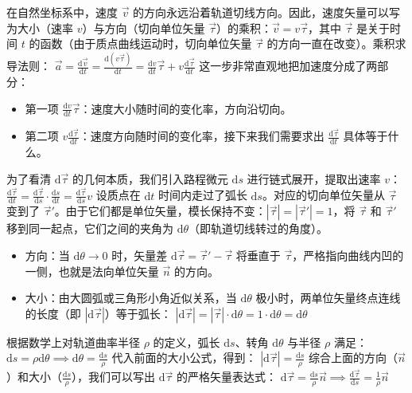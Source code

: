 \documentclass[lang=cn,11pt]{elegantbook}
\begin{document}
在自然坐标系中，速度 $\vec{v}$ 的方向永远沿着轨道切线方向。因此，速度矢量可以写为大小（速率 $v$）与方向（切向单位矢量 $\vec{\tau}$）的乘积：$\vec{v} = v\vec{\tau}$，其中 $\vec{\tau}$ 是关于时间 $t$ 的函数（由于质点曲线运动时，切向单位矢量 $\vec{\tau}$ 的方向一直在改变）。乘积求导法则： \(\vec{a} = \frac{\mathrm{d}\vec{v}}{\mathrm{d}t} = \frac{\mathrm{d}(v\vec{\tau})}{\mathrm{d}t} = \frac{\mathrm{d}v}{\mathrm{d}t}\vec{\tau} + v\frac{\mathrm{d}\vec{\tau}}{\mathrm{d}t}\) 
这一步非常直观地把加速度分成了两部分：
\begin{itemize}
\item 第一项 $\frac{\mathrm{d}v}{\mathrm{d}t}\vec{\tau}$：速度大小随时间的变化率，方向沿切向。
\item 第二项 $v\frac{\mathrm{d}\vec{\tau}}{\mathrm{d}t}$：速度方向随时间的变化率，接下来我们需要求出 $\frac{\mathrm{d}\vec{\tau}}{\mathrm{d}t}$ 具体等于什么。
\end{itemize}
为了看清 $\mathrm{d}\vec{\tau}$ 的几何本质，我们引入路程微元 $\mathrm{d}s$ 进行链式展开，提取出速率 $v$：
 \(\frac{\mathrm{d}\vec{\tau}}{\mathrm{d}t} = \frac{\mathrm{d}\vec{\tau}}{\mathrm{d}s} \cdot \frac{\mathrm{d}s}{\mathrm{d}t} = \frac{\mathrm{d}\vec{\tau}}{\mathrm{d}s} v\) 
设质点在 $\mathrm{d}t$ 时间内走过了弧长 $\mathrm{d}s$。对应的切向单位矢量从 $\vec{\tau}$ 变到了 $\vec{\tau}'$。由于它们都是单位矢量，模长保持不变：$|\vec{\tau}| = |\vec{\tau}'| = 1$，将 $\vec{\tau}$ 和 $\vec{\tau}'$ 移到同一起点，它们之间的夹角为 $\mathrm{d}\theta$（即轨道切线转过的角度）。
\begin{itemize}
\item 方向：当 $\mathrm{d}\theta \to 0$ 时，矢量差 $\mathrm{d}\vec{\tau} = \vec{\tau}' - \vec{\tau}$ 将垂直于 $\vec{\tau}$，严格指向曲线内凹的一侧，也就是法向单位矢量 $\vec{n}$ 的方向。
\item 大小：由大圆弧或三角形小角近似关系，当 $\mathrm{d}\theta$ 极小时，两单位矢量终点连线的长度（即 $|\mathrm{d}\vec{\tau}|$）等于弧长： \(|\mathrm{d}\vec{\tau}| = |\vec{\tau}| \cdot \mathrm{d}\theta = 1 \cdot \mathrm{d}\theta = \mathrm{d}\theta\) 
\end{itemize}
根据数学上对轨道曲率半径 $\rho$ 的定义，弧长 $\mathrm{d}s$、转角 $\mathrm{d}\theta$ 与半径 $\rho$ 满足：
 \(\mathrm{d}s = \rho \mathrm{d}\theta \implies \mathrm{d}\theta = \frac{\mathrm{d}s}{\rho}\) 
代入前面的大小公式，得到： \(|\mathrm{d}\vec{\tau}| = \frac{\mathrm{d}s}{\rho}\) 
综合上面的方向（$\vec{n}$）和大小（$\frac{\mathrm{d}s}{\rho}$），我们可以写出 $\mathrm{d}\vec{\tau}$ 的严格矢量表达式： \(\mathrm{d}\vec{\tau} = \frac{\mathrm{d}s}{\rho}\vec{n} \implies \frac{\mathrm{d}\vec{\tau}}{\mathrm{d}s} = \frac{1}{\rho}\vec{n}\) 
\end{document}
